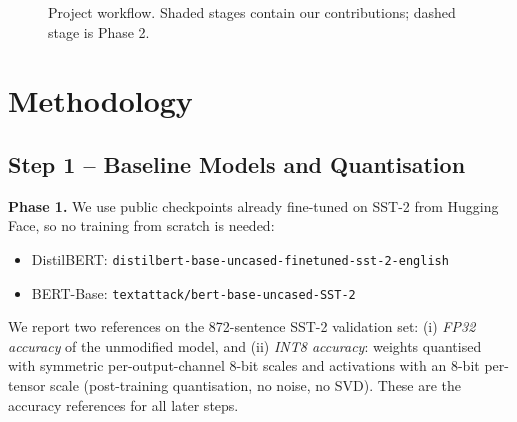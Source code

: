 \documentclass[10pt,a4paper]{article}
\begin{document}
\begin{figure}[h]
\centering
{}
\caption{Project workflow. Shaded stages contain our contributions; dashed stage is Phase 2.}
\end{figure}

\section{Methodology}

\subsection{Step 1 -- Baseline Models and Quantisation}
\textbf{Phase 1.} We use public checkpoints already fine-tuned on SST-2 from Hugging Face, so no training
from scratch is needed:
\begin{itemize}
\item DistilBERT: \texttt{distilbert-base-uncased-finetuned-sst-2-english}
\item BERT-Base: \texttt{textattack/bert-base-uncased-SST-2}
\end{itemize} We report two
references on the 872-sentence SST-2 validation set:
(i) \emph{FP32 accuracy} of the unmodified model, and
(ii) \emph{INT8 accuracy}: weights quantised with symmetric per-output-channel 8-bit scales and
activations with an 8-bit per-tensor scale (post-training quantisation, no noise, no SVD).
These are the accuracy references for all later steps.
\end{document}

